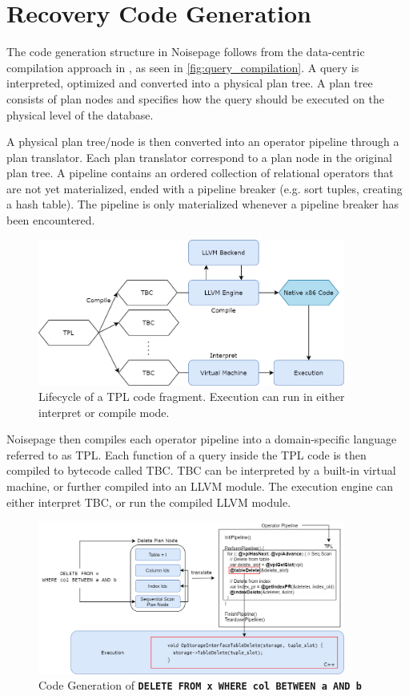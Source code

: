 \documentclass[12pt]{cmuthesis}
\newcommand{\dbSQL}[1]{\texttt{\textbf{#1}}\xspace}
\begin{document}
\section{Recovery Code Generation}
The code generation structure in Noisepage follows from the data-centric compilation approach in \cite{neumann11}, as seen in \ref{fig:query_compilation}. A query is interpreted, optimized and converted into a physical plan tree. A plan tree consists of plan nodes and specifies how the query should be executed on the physical level of the database. 

A physical plan tree/node is then converted into an operator pipeline through a plan translator. Each plan translator correspond to a plan node in the original plan tree. A pipeline contains an ordered collection of relational operators that are not yet materialized, ended with a pipeline breaker (e.g. sort tuples, creating a hash table). The pipeline is only materialized whenever a pipeline breaker has been encountered.

\begin{figure}[H]
\centering
\includegraphics[width=0.9\textwidth]{images/LLVM.png}
\caption{Lifecycle of a TPL code fragment. Execution can run in either interpret or compile mode.}
\label{fig:llvm}
\end{figure}
Noisepage then compiles each operator pipeline into a domain-specific language referred to as TPL. Each function of a query inside the TPL code is then compiled to bytecode called TBC. TBC can be interpreted by a built-in virtual machine, or further compiled into an LLVM module. The execution engine can either interpret TBC, or run the compiled LLVM module.

\begin{figure}[H]
\centering
\includegraphics[width=0.9\textwidth]{images/CodegenExample.png}
\caption{Code Generation of \dbSQL{DELETE FROM x WHERE col BETWEEN a AND b}}
\label{fig:codegen_example}
\end{figure}
\end{document}
